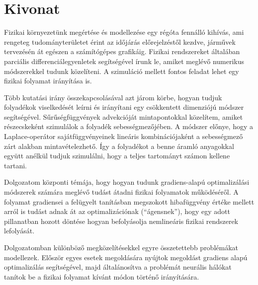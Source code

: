 \setcounter{page}{1}

\selecthungarian

\chapter*{Kivonat}

Fizikai környezetünk megértése és modellezése egy régóta fennálló kihívás, ami
rengeteg tudományterületet érint az időjárás előrejelzéstől kezdve, járművek
tervezésén át egészen a számítógépes grafikáig. Fizikai rendszereket általában
parciális differenciálegyenletek segítségével írunk le, amiket meglévő numerikus
módszerekkel tudunk közelíteni. A szimuláció mellett fontos feladat lehet egy
fizikai folyamat irányítása is.  

Több kutatási irány összekapcsolásával azt járom körbe, hogyan tudjuk folyadékok
viselkedését leírni és irányítani egy csökkentett dimenziójú módszer
segítségével. Sűrűségfüggvények advekcióját mintapontokkal közelítem, amiket
részecskeként szimulálok a folyadék sebességmezőjében. A módszer előnye, hogy
a Laplace-operátor sajátfüggvényeinek lineáris kombinációjaként  a sebességmező
zárt alakban mintavételezhető. Így a folyadékot a benne áramló anyagokkal
együtt  anélkül tudjuk szimulálni, hogy a teljes tartományt számon kellene
tartani.

Dolgozatom központi témája, hogy hogyan tudunk gradiens-alapú optimalizálási
módszerek számára meglévő tudást átadni fizikai folyamatok működéséről.
A folyamat gradiensei a felügyelt tanításban megszokott hibafüggvény értéke
mellett arról is tudást adnak át az optimalizációnak (``ágensnek''), hogy egy
adott pillanatban hozott döntése hogyan befolyásolja nemlineáris fizikai
rendszerek lefolyását.

Dolgozatomban különböző megközelítésekkel egyre összetettebb problémákat
modellezek. Először egyes esetek megoldására nyújtok megoldást gradiens alapú
optimalizálás segítségével, majd általánosítva a problémát neurális hálókat
tanítok be a fizikai folyamat kívánt módon történő irányítására.

\vfill
\selectenglish


